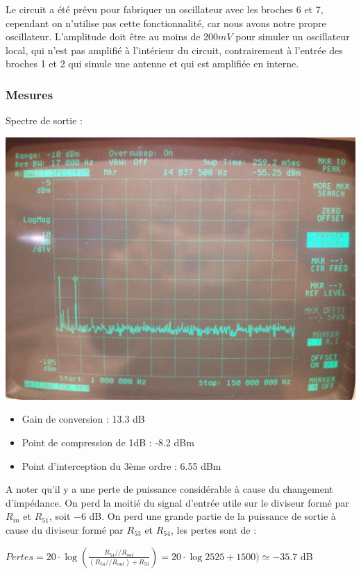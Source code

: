 \documentclass{article}
\begin{document}

Le circuit a été prévu pour fabriquer un oscillateur avec les broches 6 et 7, cependant on n'utilise pas cette fonctionnalité, car nous avons notre propre oscillateur. L'amplitude doit être au moins de $200mV$ pour simuler un oscillateur local, qui n'est pas amplifié à l'intérieur du circuit, contrairement à l'entrée des broches 1 et 2 qui simule une antenne et qui est amplifiée en interne.

\subsubsection{Mesures}


Spectre de sortie :
\begin{center}
\includegraphics[width=0.7\linewidth]{8_3_1.jpg}
\end{center}


\begin{itemize}

\item Gain de conversion : 13.3 dB
\item Point de compression de 1dB : -8.2 dBm
\item Point d'interception du 3ème ordre : 6.55 dBm
\end{itemize}

A noter qu'il y a une perte de puissance considérable à cause du changement d'impédance. On perd la moitié du signal d'entrée utile sur le diviseur formé par $R_{in}$ et $R_{51}$, soit $-6$ dB. On perd une grande partie de la puissance de sortie à cause du diviseur formé par $R_{53}$ et $R_{54}$, les pertes sont de :
\begin{center}
$Pertes = 20\cdot \log (\frac{R_{54} // R_{out}}{(R_{54} // R_{out})+R_{53}}) = 20\cdot \log{25}{25+1500}) \simeq -35.7$ dB
\end{center}
\end{document}
